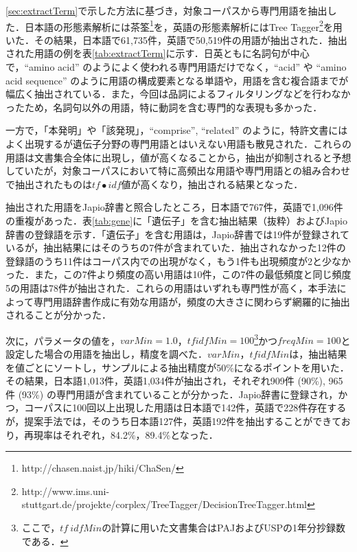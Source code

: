 \documentclass[japanese]{jnlp_1.3e}
\begin{document}
\ref{sec:extractTerm}で示した方法に基づき，対象コーパスから専門用語を抽出した．日本語の形態素解析には茶筌\footnote{http://chasen.naist.jp/hiki/ChaSen/}を，英語の形態素解析にはTree Tagger\footnote{http://www.ims.uni-stuttgart.de/projekte/corplex/TreeTagger/DecisionTreeTagger.html }を用いた．その結果，日本語で61,735件，英語で50,519件の用語が抽出された．抽出された用語の例を表\ref{tab:extractTerm}に示す．日英ともに名詞句が中心で，``amino acid'' のようによく使われる専門用語だけでなく，``acid'' や ``amino acid sequence'' のように用語の構成要素となる単語や，用語を含む複合語までが幅広く抽出されている．また，今回は品詞によるフィルタリングなどを行わなかったため，名詞句以外の用語，特に動詞を含む専門的な表現も多かった．

\begin{table}[t]

\end{table}

一方で，「本発明」や「該発現」，``comprise'', ``related'' のように，特許文書にはよく出現するが遺伝子分野の専門用語とはいえない用語も散見された．これらの用語は文書集合全体に出現し，値が高くなることから，抽出が抑制されると予想していたが，対象コーパスにおいて特に高頻出な用語や専門用語との組み合わせで抽出されたものは$\mathit{tf} \bullet \mathit{idf}$値が高くなり，抽出される結果となった．

抽出された用語をJapio辞書と照合したところ，日本語で767件，英語で1,096件の重複があった．表\ref{tab:gene}に「遺伝子」を含む抽出結果（抜粋）およびJapio辞書の登録語を示す．「遺伝子」を含む用語は，Japio辞書では19件が登録されているが，抽出結果にはそのうちの7件が含まれていた．抽出されなかった12件の登録語のうち11件はコーパス内での出現がなく，もう1件も出現頻度が2と少なかった．また，この7件より頻度の高い用語は10件，この7件の最低頻度と同じ頻度5の用語は78件が抽出された．これらの用語はいずれも専門性が高く，本手法によって専門用語辞書作成に有効な用語が，頻度の大きさに関わらず網羅的に抽出されることが分かった．


次に，パラメータの値を，$\mathit{varMin}=1.0$，$\mathit{tfidfMin}=100$\footnote{ここで，$\mathit{tf}\ \mathit{idfMin}$の計算に用いた文書集合はPAJおよびUSPの1年分抄録数である．}かつ$\mathit{freqMin}=100$と設定した場合の用語を抽出し，精度を調べた．$\mathit{varMin}$，$\mathit{tfidfMin}$は，抽出結果を値ごとにソートし，サンプルによる抽出精度が50\%になるポイントを用いた．その結果，日本語1,013件，英語1,034件が抽出され，それぞれ909件 (90\%), 965件 (93\%) の専門用語が含まれていることが分かった．Japio辞書に登録され，かつ，コーパスに100回以上出現した用語は日本語で142件，英語で228件存在するが，提案手法では，そのうち日本語127件，英語192件を抽出することができており，再現率はそれぞれ，84.2\%，89.4\%となった．
\end{document}

